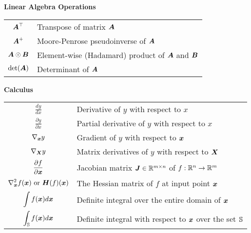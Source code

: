 \vspace{\notationgap}
\begin{minipage}{\textwidth}
\centerline{\bf Linear Algebra Operations}
\bgroup
\def\arraystretch{1.5}
\begin{tabular}{cp{3.25in}}
$\displaystyle {\bm{A}}^\top$ & Transpose of matrix ${\bm{A}}$ \\
$\displaystyle {\bm{A}}^+$ & Moore-Penrose pseudoinverse of ${\bm{A}}$\\
$\displaystyle {\bm{A}} \odot {\bm{B}} $ & Element-wise (Hadamard) product of ${\bm{A}}$ and ${\bm{B}}$ \\
$\displaystyle \mathrm{det}({\bm{A}})$ & Determinant of ${\bm{A}}$ \\
\end{tabular}
\egroup
{}
\end{minipage}

\vspace{\notationgap}
\begin{minipage}{\textwidth}
\centerline{\bf Calculus}
\bgroup
\def\arraystretch{1.5}
\begin{tabular}{cp{3.25in}}
$\displaystyle\frac{d y} {d x}$ & Derivative of $y$ with respect to $x$\\ [2ex]
$\displaystyle \frac{\partial y} {\partial x} $ & Partial derivative of $y$ with respect to $x$ \\
$\displaystyle \nabla_{\bm{x}} y $ & Gradient of $y$ with respect to ${\bm{x}}$ \\
$\displaystyle \nabla_{\bm{X}} y $ & Matrix derivatives of $y$ with respect to ${\bm{X}}$ \\
$\displaystyle \frac{\partial f}{\partial {\bm{x}}} $ & Jacobian matrix ${\bm{J}} \in \mathbb{R}^{m\times n}$ of $f: \mathbb{R}^n \rightarrow \mathbb{R}^m$\\
$\displaystyle \nabla_{\bm{x}}^2 f({\bm{x}})\text{ or }{\bm{H}}( f)({\bm{x}})$ & The Hessian matrix of $f$ at input point ${\bm{x}}$\\
$\displaystyle \int f({\bm{x}}) d{\bm{x}} $ & Definite integral over the entire domain of ${\bm{x}}$ \\
$\displaystyle \int_{\mathbb{S}} f({\bm{x}}) d{\bm{x}}$ & Definite integral with respect to ${\bm{x}}$ over the set ${\mathbb{S}}$ \\
\end{tabular}
\egroup
{}
\end{minipage}

